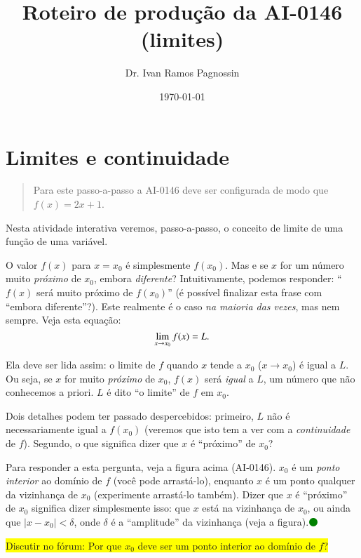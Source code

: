 \documentclass[fleqn,12pt]{article}
\title{Roteiro de produção da AI-0146 (limites)}
\author{Dr. Ivan Ramos Pagnossin}
\date{\today}
\newenvironment{ct}{\begin{quotation}\color{red!30!black}\sffamily\small}{\end{quotation}} %
\newcommand\ctc[1]{\textcolor{red!30!black}{{\sffamily#1}}} %
\newcommand\proceed{\textcolor{green}{$\medbullet$}\xspace}
\newcommand\forum[1]{\colorbox{yellow}{Discutir no fórum: #1}}
\begin{document}
    \maketitle
    


    \section{Limites e continuidade}

    \begin{ct}
	Para este passo-a-passo a AI-0146 deve ser configurada de modo que $f(x) = 2x + 1$.
    \end{ct}

    Nesta atividade interativa veremos, passo-a-passo, o conceito de limite de uma função de uma variável.

    O valor $f(x)$ para $x = x_0$ é simplesmente $f(x_0)$. Mas e se $x$ for um número muito \emph{próximo} de $x_0$, embora \emph{diferente}? Intuitivamente, podemos responder: ``$f(x)$ será muito próximo de $f(x_0)$'' (é possível finalizar esta frase com ``embora diferente''?). Este realmente é o caso \emph{na maioria das vezes}, mas nem sempre. Veja esta equação:
    \begin{equation*}
	\lim_{\scriptsize x  \to x_0} f(x) = L.
    \end{equation*}

    Ela deve ser lida assim: o limite de $f$ quando $x$ tende a $x_0$ ($x \to x_0$) é igual a $L$. Ou seja, se $x$ for muito \emph{próximo} de $x_0$, $f(x)$ será \emph{igual} a $L$, um número que não conhecemos a priori. $L$ é dito ``o limite'' de $f$ em $x_0$.

    Dois detalhes podem ter passado despercebidos: primeiro, $L$ não é necessariamente igual a $f(x_0)$ (veremos que isto tem a ver com a \emph{continuidade} de $f$). Segundo, o que significa dizer que $x$ é ``próximo'' de $x_0$?

    Para responder a esta pergunta, veja a figura acima \ctc{(AI-0146)}. $x_0$ é um \emph{ponto interior} ao domínio de $f$ (você pode arrastá-lo), enquanto $x$ é um ponto qualquer da vizinhança de $x_0$ (experimente arrastá-lo também). Dizer que $x$ é ``próximo'' de $x_0$ significa dizer simplesmente isso: que $x$ está na vizinhança de $x_0$, ou ainda que $|x - x_0| < \delta$, onde $\delta$ é a ``amplitude'' da vizinhança (veja a figura).\proceed

    \forum{Por que $x_0$ deve ser um ponto interior ao domínio de $f$?}
\end{document}
